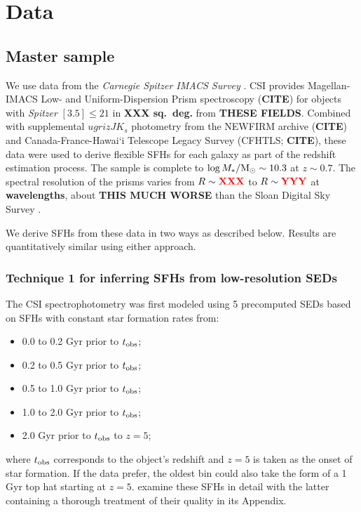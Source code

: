 \documentclass[a4paper,fleqn,usenatbib]{mnras}
\newcommand{\Msun}{{\rm M}_\odot}
\newcommand{\Mstel}{M_\ast}
\newcommand{\logM}{\log\Mstel/\Msun}
\newcommand{\bfr}{\bf\color{red}}
\newcommand{\tobs}{t_{\rm obs}}
\newcommand{\bitem}{\begin{itemize}}
\newcommand{\eitem}{\end{itemize}}
\newcommand{\CITE}{{\bfr CITE}}
\begin{document}

\section{Data}
\label{sec:data}

\subsection{Master sample}
\label{sec:master}

We use data from the {\it Carnegie Spitzer IMACS Survey} \citep[CSI;][]{Kelson14a}. CSI provides
Magellan-IMACS Low- and Uniform-Dispersion Prism spectroscopy (\CITE) for objects with {\it Spitzer} 
$[3.5]\leq21$ in {\bfr XXX sq.~deg.} from {\bfr THESE FIELDS}. Combined with supplemental 
$ugrizJK_{s}$ photometry from the NEWFIRM archive (\CITE) and Canada-France-Hawai`i Telescope 
Legacy Survey (CFHTLS; \CITE), these data were used to derive flexible SFHs for each galaxy as part of 
the redshift estimation process. The sample is complete to $\logM\sim10.3$ at $z\sim0.7$.
The spectral resolution of the prisms varies from $R\sim{\bfr XXX}$ to $R\sim{\bfr YYY}$ at
{\bfr wavelengths}, about {\bfr THIS MUCH WORSE} than the Sloan Digital Sky Survey \citep{York00}.

We derive SFHs from these data in two ways as described below. Results are quantitatively similar
using either approach.


\subsubsection{Technique 1 for inferring SFHs from low-resolution SEDs}
\label{sec:blocks}

The CSI spectrophotometry was first modeled using 5 precomputed SEDs based on SFHs with 
constant star formation rates from:
\bitem
	\item 0.0 to 0.2 Gyr prior to $\tobs$;
	\item 0.2 to 0.5 Gyr prior to $\tobs$;
	\item 0.5 to 1.0 Gyr prior to $\tobs$;
	\item 1.0 to 2.0 Gyr prior to $\tobs$;
	\item 2.0 Gyr prior to $\tobs$ to $z=5$;
\eitem
where $\tobs$ corresponds to the object's redshift and $z=5$ is taken as the onset of star formation. If 
the data prefer, the oldest bin could also take the form of a 1 Gyr top hat starting at $z=5$. 
\citet{Dressler16, Dressler18} examine these SFHs in detail with the latter containing a thorough 
treatment of their quality in its Appendix.
\end{document}
